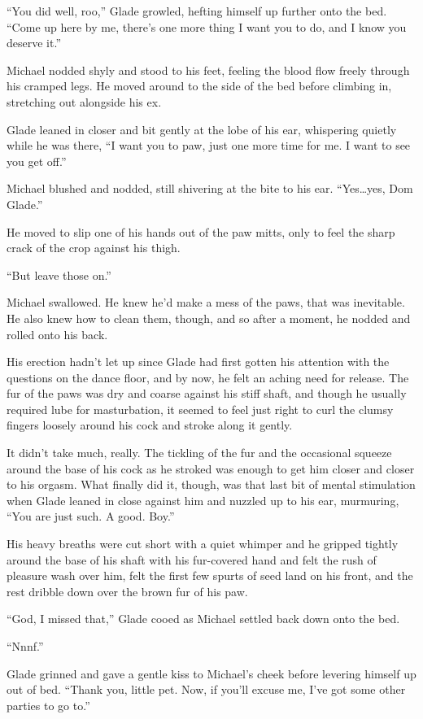 ``You did well, roo,'' Glade growled, hefting himself up further onto the bed.  ``Come up here by me, there's one more thing I want you to do, and I know you deserve it.''

Michael nodded shyly and stood to his feet, feeling the blood flow freely through his cramped legs.  He moved around to the side of the bed before climbing in, stretching out alongside his ex.

Glade leaned in closer and bit gently at the lobe of his ear, whispering quietly while he was there, ``I want you to paw, just one more time for me. I want to see you get off.''

Michael blushed and nodded, still shivering at the bite to his ear.  ``Yes\ldots{}yes, Dom Glade.''

He moved to slip one of his hands out of the paw mitts, only to feel the sharp crack of the crop against his thigh.

``But leave those on.''

Michael swallowed.  He knew he'd make a mess of the paws, that was inevitable.  He also knew how to clean them, though, and so after a moment, he nodded and rolled onto his back.

His erection hadn't let up since Glade had first gotten his attention with the questions on the dance floor, and by now, he felt an aching need for release.  The fur of the paws was dry and coarse against his stiff shaft, and though he usually required lube for masturbation, it seemed to feel just right to curl the clumsy fingers loosely around his cock and stroke along it gently.

It didn't take much, really.  The tickling of the fur and the occasional squeeze around the base of his cock as he stroked was enough to get him closer and closer to his orgasm.  What finally did it, though, was that last bit of mental stimulation when Glade leaned in close against him and nuzzled up to his ear, murmuring, ``You are just such. A good. Boy.''

His heavy breaths were cut short with a quiet whimper and he gripped tightly around the base of his shaft with his fur-covered hand and felt the rush of pleasure wash over him, felt the first few spurts of seed land on his front, and the rest dribble down over the brown fur of his paw.

``God, I missed that,'' Glade cooed as Michael settled back down onto the bed.

``Nnnf.''

Glade grinned and gave a gentle kiss to Michael's cheek before levering himself up out of bed.  ``Thank you, little pet.  Now, if you'll excuse me, I've got some other parties to go to.''

